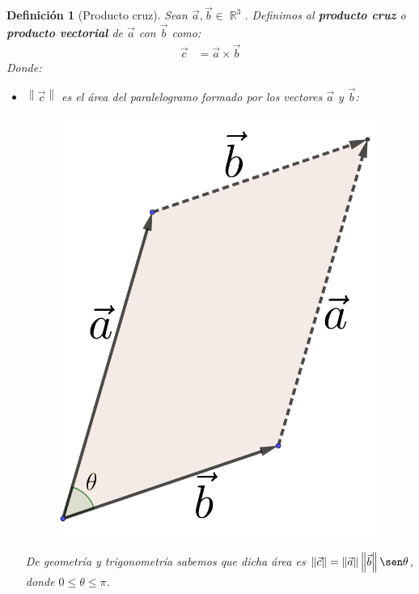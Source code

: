 \documentclass[12pt, fleqn]{report}                             %
\newcommand{\Abs}[1]{\left\lVert #1 \right\lVert}               %
\newtheorem{Definition}{Definición}[section]                    %
\DeclareMathOperator \Reals        {\mathbb{R}}                 %
\begin{document}
            	\begin{Definition}[Producto cruz]
	            	Sean $\vec{a}, \vec{b} \in \Reals^3$. Definimos al \textbf{producto cruz} o \textbf{producto vectorial} de $\vec{a}$ con $\vec{b}$ como:
	            	\begin{align}
		            	\vec{c} &= \vec{a} \times \vec{b} \label{defCross}
	            	\end{align}
	            	Donde: \begin{itemize}\setlength\itemsep{0em}
	            		\item $\Abs{\vec{c}}$ es el área del paralelogramo formado por los vectores $\vec{a}$ y $\vec{b}$:
	            		\begin{figure}[H]
	            			\centering
	            			\includegraphics[scale=1.2]{parallelogram.png}
	            		\end{figure}
            			De geometría y trigonometría sabemos que dicha área es $\Abs{\vec{c}}=\Abs{\vec{a}} \Abs{\vec{b}} \sen \theta$, donde $0 \leq \theta \leq \pi$.
            			

\end{itemize}
\end{Definition}
\end{document}
